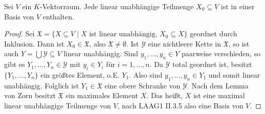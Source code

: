 \begin{conclusion}[Basisergänzungssatz]
	Sei $V$ ein $K$-Vektorraum. Jede linear unabhängige Teilmenge $X_0\subseteq V$ ist in einer Basis von $V$ enthalten.
\end{conclusion}
\begin{proof}
	Sei $\mathfrak{X}=\{X\subseteq V\mid X\text{ ist linear unabhängig, } X_0\subseteq X\}$ geordnet durch Inklusion. Dann ist $X_0\in\mathfrak{X}$, also $\mathfrak{X}\neq\emptyset$. Ist $\mathcal{Y}$ eine nichtleere Kette in $\mathfrak{X}$, so ist auch $Y=\bigcup\mathcal{Y}\subseteq V$ linear unabhängig. Sind $y_1,...,y_n\in Y$ paarweise verschieden, so gibt es $Y_1,...,Y_n\in\mathcal{Y}$ mit $y_i\in Y_i$ für $i=1,...,n$. Da $\mathcal{Y}$ total geordnet ist, besitzt $\{Y_1,...,Y_n\}$ ein größtes Element, o.E. $Y_1$. Also sind $y_1,...,y_n\in Y_1$ und somit linear unabhängig. Folglich ist $Y_1\in \mathfrak{X}$ eine obere Schranke von $\mathcal{Y}$. Nach dem Lemma von Zorn besitzt $\mathfrak{X}$ ein maximales Element $X$. Das heißt, $X$ ist eine maximal linear unabhängige Teilmenge von $V$, nach LAAG1 II.3.5 also eine Basis von $V$. %
	\end{proof}